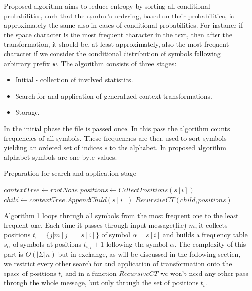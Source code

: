\documentclass[smallabstract,smallcaptions]{dccpaper}
\begin{document}
\clearpage
{}
\label{sec:algorithm}

Proposed algorithm aims to reduce entropy by sorting all conditional probabilities, such that the symbol's ordering, based on their probabilities, is approximately the same also in cases of conditional probabilities. For instance if the space character is the most frequent character in the text, then after the transformation, it should be, at least approximately, also the most frequent character if we consider the conditional distribution of symbols following arbitrary prefix $w$. The algorithm consists of three stages:

\begin{itemize}
\item Initial - collection of involved statistics.
\item Search for and application of generalized context transformations.
\item Storage.
\end{itemize}


In the initial phase the file is passed once. In this pass the algorithm counts frequencies of all symbols. These frequencies are then used to sort symbols yielding an ordered set of indices $s$ to the alphabet. In proposed algorithm alphabet symbols are one byte values.

\begin{algorithm}
\caption{Preparation for search and application stage}
\label{alg:prep}
\begin{algorithmic}
\State $contextTree \gets rootNode$
\State $positions \gets CollectPositions(s[i])$
\State $child \gets contextTree.AppendChild(s[i])$
\State $RecursiveCT(child,positions)$
\EndFor
\EndFunction
\end{algorithmic}
\end{algorithm}

Algorithm 1 loops through all symbols from the most frequent one to the least frequent one. Each time it passes through input message(file) $m$, it collects positions $t_i=\{j|m[j] = s[i]\}$ of symbol $\alpha = s[i]$ and builds a frequency table $s_\alpha$ of symbols at positions $t_{i,j}+1$ following the symbol $\alpha$. The complexity of this part is $O(|\Sigma|n)$ but in exchange, as will be discussed in the following section, we restrict every other search for and application of transformation onto the space of positions $t_i$ and in a function $RecursiveCT$ we won't need any other pass through the whole message, but only through the set of positions $t_i$.
\end{document}
